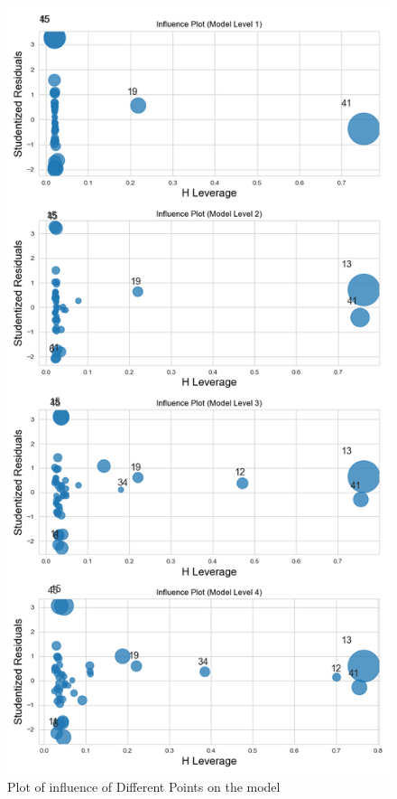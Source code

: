 \documentclass[11pt, oneside]{article}   	%
\begin{document}
\begin{figure}[H]
    \begin{center}
    \includegraphics[width=0.5\linewidth]{../plots/fnn_data/hierarchy1/influence}
    \caption{Plot of influence of Different Points on the model}
    \end{center}
\end{figure}
\end{document}
